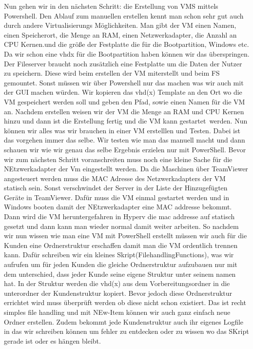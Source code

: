 \documentclass[conference]{IEEEtran}
\begin{document}
Nun gehen wir in den nächsten Schritt: die Erstellung von VMS mittels Powershell. Den Ablauf zum manuellen erstellen kennt man schon sehr gut auch durch andere Virtualisierungs Möglichkeiten. Man gibt der VM einen Namen, einen Speicherort, die Menge an RAM, einen Netzwerkadapter, die Anzahl an CPU Kernen.und die größe der Festplatte die für die Bootpartition, Windows etc. Da wir schon eine vhdx für die Bootpartition haben können wir das überspringen. Der Fileserver braucht noch zusätzlich eine Festplatte um die Daten der Nutzer zu speichern. Diese wird beim erstellen der VM miterstellt und beim FS gemountet. Sonst müssen wir über Powershell nur das machen was wir auch mit der GUI machen würden. Wir kopieren das vhd(x) Template an den Ort wo die VM gespeichert werden soll und geben den Pfad, sowie einen Namen für die VM an. Nachdem erstellen weisen wir der VM die Menge an RAM und CPU Kernen hinzu und dann ist die Erstellung fertig und die VM kann gestartet werden. 
Nun können wir alles was wir brauchen in einer VM erstelllen und Testen. Dabei ist das vorgehen immer das selbe. Wir testen wie man das manuell macht und dann schauen wir wie wir genau das selbe Ergebnis erzielen nur mit PowerShell.
Bevor wir zum nächsten Schritt voranschreiten muss noch eine kleine Sache für die NEtzwerkadapter der Vm eingestellt werden. Da die Maschinen über TeamViewer angesteuert werden muss die MAC Adresse des Netzwerkadapters der VM statisch sein. Sonst verschwindet der Server in der Liste der Hinzugefügten Geräte in TeamViewer. Dafür muss die VM einmal gestartet werden und in Windows booten damit der NEtzwerkadapter eine MAC addresse bekommt. Dann wird die VM heruntergefahren in Hyperv die mac addresse auf statisch gesetzt und dann kann man wieder normal damit weiter arbeiten.
So nachdem wir nun wissen wie man eine VM mit PowerShell erstellt müssen wir auch für die Kunden eine Ordnerstruktur erschaffen damit man die VM ordentlich trennen kann. Dafür schreiben wir ein kleines Skript(FilehandlingFunctions), was wir aufrufen um für jeden Kunden die gleiche Ordnerstruktur aufzubauen nur mit dem unterschied, dass jeder Kunde seine eigene Struktur unter seinem namen hat. In der Struktur werden die vhd(x) aus dem Vorbereitungsordner in die unterordner der Kundenstruktur kopiert. Bevor jedoch diese Ordnerstruktur errichtet wird muss überprüft werden ob diese nicht schon existiert. Das ist recht simples file handling und mit NEw-Item können wir auch ganz einfach neue Ordner erstellen. Zudem bekommt jede Kundenstruktur auch ihr eigenes Logfile in das wir schreiben können um fehler zu entdecken oder zu wissen wo das SKript gerade ist oder es hängen bleibt. 
\end{document}
